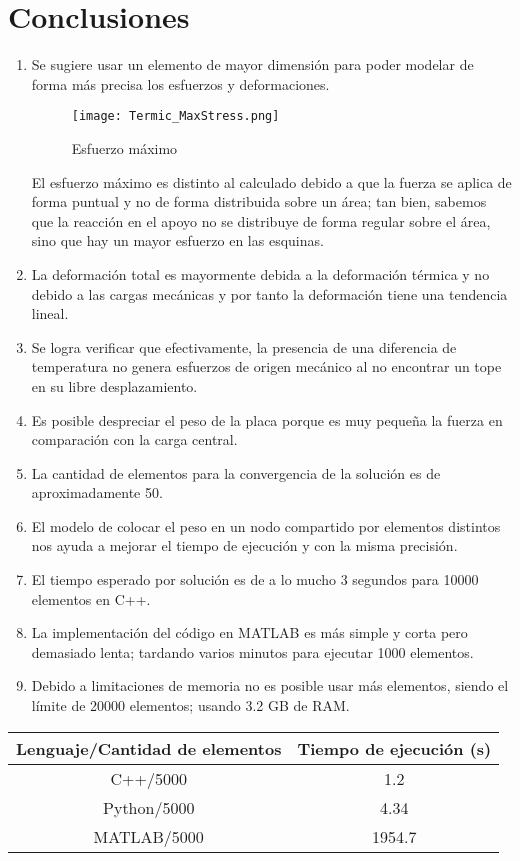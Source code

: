\documentclass[10pt,a4paper]{article}
\begin{document}
\section{Conclusiones}
\begin{enumerate}
\item Se sugiere usar un elemento de mayor dimensión para poder modelar de forma más precisa los esfuerzos y deformaciones.
\begin{figure}[H]
    \centering
    \texttt{[image: Termic\_MaxStress.png]}
    \caption{Esfuerzo máximo}
\end{figure}
El esfuerzo máximo es distinto al calculado debido a que la fuerza se aplica de forma puntual y no de forma distribuida sobre un área; tan bien, sabemos que la reacción en el apoyo no se distribuye de forma regular sobre el área, sino que hay un mayor esfuerzo en las esquinas.
\item La deformación total es mayormente debida a la deformación térmica y no debido a las cargas mecánicas y por tanto la deformación tiene una tendencia lineal.
\item Se logra verificar que efectivamente, la presencia de una diferencia de temperatura no genera esfuerzos de origen mecánico al no encontrar un tope en su libre desplazamiento.
\item Es posible despreciar el peso de la placa porque es muy pequeña la fuerza en comparación con la carga central.
\item La cantidad de elementos para la convergencia de la solución es de aproximadamente 50.
\item El modelo de colocar el peso en un nodo compartido por elementos distintos nos ayuda a mejorar el tiempo de ejecución y con la misma precisión.
\item El tiempo esperado por solución es de a lo mucho 3 segundos para 10000 elementos en C++.
\item La implementación del código en MATLAB es más simple y corta pero demasiado lenta; tardando varios minutos para ejecutar 1000 elementos.
\item Debido a limitaciones de memoria no es posible usar más elementos, siendo el límite de 20000 elementos; usando 3.2 GB de RAM.
\end{enumerate}
\begin{center}
\begin{tabular}{|c|c|}
\hline 
Lenguaje/Cantidad de elementos & Tiempo de ejecución (s) \\ 
\hline 
C++/5000 & 1.2 \\ 
\hline 
Python/5000 & 4.34 \\ 
\hline 
MATLAB/5000 & 1954.7 \\ 
\hline 
\end{tabular}
\end{center}
\end{document}
